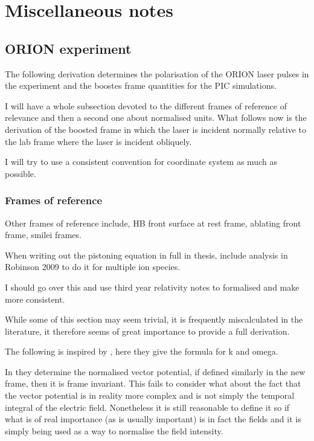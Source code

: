 \chapter{\label{ch:x-misc}Miscellaneous notes}

\minitoc

\section{ORION experiment} 
The following derivation determines the polarisation of the ORION laser pulses in the experiment and the boostes frame quantities for the PIC simulations.

I will have a whole subsection devoted to the different frames of reference of relevance and then a second one about normalised units. What follows now is the derivation of the boosted frame in which the laser is incident normally relative to the lab frame where the laser is incident obliquely.

I will try to use a consistent convention for coordinate system as much as possible.

\subsection{Frames of reference}
Other frames of reference include, HB front surface at rest frame, ablating front frame, smilei frames. 

When writing out the pistoning equation in full in thesis, include analysis in Robinson 2009 to do it for multiple ion species.



I should go over this and use third year relativity notes to formalised and make more consistent.

While some of this section may seem trivial, it is frequently miscalculated in the literature, it therefore seems of great importance to provide a full derivation.

The following is inspired by \cite{bourdierObliqueIncidenceStrong1983}, here they give the formula for k and omega.

In \cite{bourdierDynamicsChargedParticle2001} they determine the normalised vector potential, if defined similarly in the new frame, then it is frame invariant. This fails to consider what about the fact that the vector potential is in reality more complex and is not simply the temporal integral of the electric field. Nonetheless it is still reasonable to define it so if what is of real importance (as is usually important) is in fact the fields and it is simply being used as a way to normalise the field intensity.

